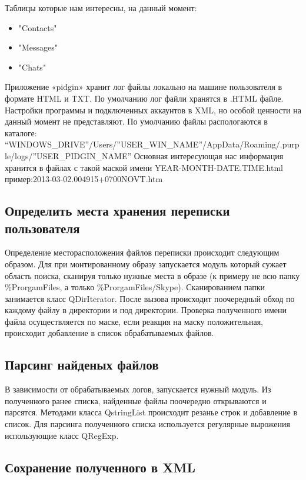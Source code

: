 Таблицы которые нам интересны, на данный момент:    

\begin{itemize}
\item"Contacts"
\item"Messages"
\item"Chats" 
\end{itemize}

Приложение «pidgin» хранит лог файлы локально на машине пользователя в формате HTML и TXT. По умолчанию лог файли хранятся в .HTML файле. Настройки программы и подключенных аккаунтов в XML, но особой ценности на данный момент не представляют.
По умолчанию файлы распологаются в каталоге: “WINDOWS\_DRIVE”/Users/”USER\_WIN\_NAME”/AppData/Roaming/.purple/logs/”USER\_PIDGIN\_NAME”
Основная интересующая нас информация хранится в файлах с такой маской имени YEAR-MONTH-DATE.TIME.html пример:2013-03-02.004915+0700NOVT.htm

\subsection{Определить места хранения переписки пользователя}

Определение месторасположения файлов переписки происходит следующим образом. Для при монтированному образу запускается модуль который сужает область поиска, сканируя только нужные места в образе (к примеру не всю папку \%ProrgamFiles, а только \%ProrgamFiles/Skype). Сканированием папки занимается класс QDirIterator. После вызова происходит поочередный обход по каждому файлу в директории и под директории. Проверка полученного имени файла  осуществляется по маске, если реакция на маску положительная, происходит добавление в список обрабатываемых файлов. 


\subsection{Парсинг найденых файлов}

В зависимости от обрабатываемых логов, запускается нужный модуль. Из полученного ранее списка, найденные файлы поочередно открываются и парсятся. Методами класса QstringList происходит резанье строк и добавление в список. Для парсинга полученного списка используется регулярные вырожения использующие класс QRegExp. 

\subsection{Сохранение полученного в XML}

